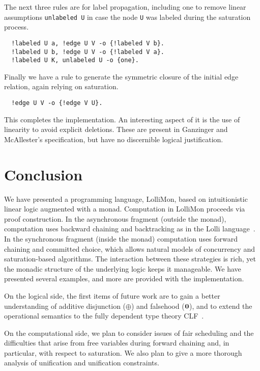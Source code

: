 \documentclass{sig-alt}
\begin{document}
The next three rules are for label propagation, including
one to remove linear assumptions \texttt{unlabeled U} in case
the node \texttt{U} was labeled during the saturation process.

\begin{small}\begin{verbatim}
  !labeled U a, !edge U V -o {!labeled V b}.
  !labeled U b, !edge U V -o {!labeled V a}.
  !labeled U K, unlabeled U -o {one}.
\end{verbatim}\end{small}

Finally we have a rule to generate the symmetric closure
of the initial edge relation, again relying on saturation.

\begin{small}\begin{verbatim}
  !edge U V -o {!edge V U}.
\end{verbatim}\end{small}

This completes the implementation.  An interesting aspect of it is the
use of linearity to avoid explicit deletions.  These are present in
Ganzinger and McAllester's specification, but have no discernible
logical justification.

\section{Conclusion}
\label{sec:conclusion}

We have presented a programming language, LolliMon, based on intuitionistic
linear logic augmented with a monad.  Computation in LolliMon proceeds via proof
construction.  In the asynchronous fragment (outside the monad),
computation uses backward chaining and backtracking as in the Lolli
language~\cite{Hodas94ic}.  In the synchronous fragment (inside the
monad) computation uses forward chaining and committed choice, which
allows natural models of concurrency and saturation-based
algorithms.  The interaction between these strategies is rich,
yet the monadic structure of the underlying logic keeps it manageable.
We have presented several examples, and more are provided with the
implementation.

On the logical side, the first items of future work are to gain a better
understanding of additive disjunction ($\oplus$) and falsehood
($\textbf{0}$), and to extend the operational semantics to the fully
dependent type theory CLF~\cite{Watkins02tr}.

On the computational side, we plan to consider issues of fair scheduling
and the difficulties that arise from free variables during forward
chaining and, in particular, with respect to saturation.  We also plan to
give a more thorough analysis of unification and unification
constraints.
\end{document}
